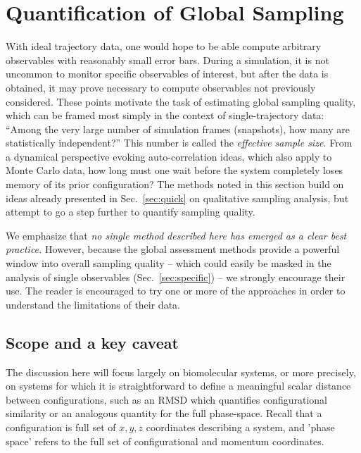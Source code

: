 \section{Quantification of Global Sampling}
\label{sec:global}

With ideal trajectory data, one would hope to be able compute arbitrary observables with reasonably small error bars.
During a simulation, it is not uncommon to monitor specific observables of interest, but after the data is obtained, it may prove necessary to compute observables not previously considered.
These points motivate the task of estimating global sampling quality, which can be framed most simply in the context of single-trajectory data:
``Among the very large number of simulation frames (snapshots), how many are statistically independent?''
This number is called the \emph{effective sample size.}
From a dynamical perspective evoking auto-correlation ideas, which also apply to Monte Carlo data, how long must one wait before the system completely loses memory of its prior configuration?  
The methods noted in this section build on ideas already presented in Sec.\ \ref{sec:quick} on qualitative sampling analysis, but attempt to go a step further to quantify sampling quality.

We emphasize that \emph{no single method described here has emerged as a clear best practice.}
However, because the global assessment methods provide a powerful window into overall sampling quality -- which could easily be masked in the analysis of single observables (Sec.\ \ref{sec:specific}) -- we strongly encourage their use.
The reader is encouraged to try one or more of the approaches in order to understand the limitations of their data.

\subsection{Scope and a key caveat}
The discussion here will focus largely on biomolecular systems, or more precisely, on systems for which it is straightforward to define a meaningful scalar distance between configurations, such as an RMSD which quantifies configurational similarity or an analogous quantity for the full phase-space.
Recall that a configuration is full set of $x, y, z$ coordinates describing a system, and 'phase space' refers to the full set of configurational and momentum coordinates.

